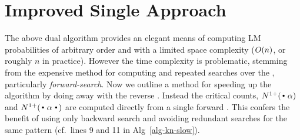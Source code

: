 \section{Improved Single \CST Approach}
\label{sec-single-cst}

The above dual \CST algorithm provides an elegant means of computing LM probabilities of arbitrary order and with a limited space complexity ($O(n)$, or roughly $n$ in practice).
However the time complexity is problematic, stemming from the expensive method for computing \nlplusfrontbackname and repeated searches over the \CST, particularly \emph{forward-search}.
Now we outline a method for speeding up the algorithm by doing away with the reverse \CST.
Instead the critical counts, $\nlplus{\dotpat}$ and $\nlplus{\dotpatdot}$ are computed directly from a single forward \CST. 
This confers the benefit of using only backward search and avoiding redundant searches for the same pattern (cf.~lines 9 and 11 in Alg~\ref{alg-kn-slow}).


